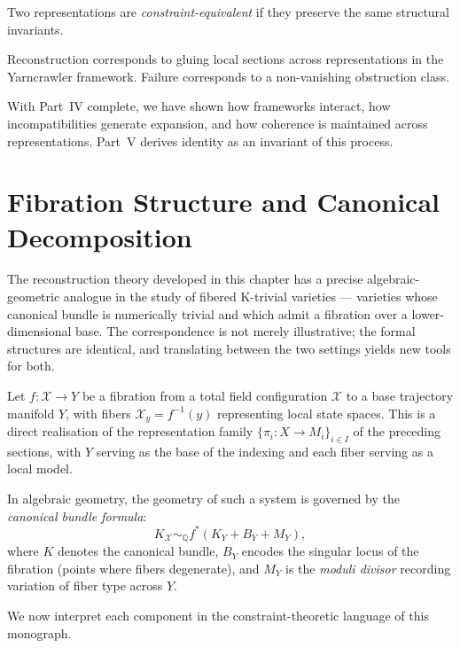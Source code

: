 \documentclass[11pt,openany]{book}
\begin{document}
\begin{definition}
\label{def:equivalence}
Two representations are \emph{constraint-equivalent} if
they preserve the same structural invariants.
\end{definition}

\begin{proposition}
\label{prop:gluing}
Reconstruction corresponds to gluing local sections across
representations in the Yarncrawler framework. Failure
corresponds to a non-vanishing obstruction class.
\end{proposition}

With Part~IV complete, we have shown how frameworks
interact, how incompatibilities generate expansion, and how
coherence is maintained across representations. Part~V
derives identity as an invariant of this process.


\section{Fibration Structure and Canonical Decomposition}
\label{sec:fibration-canonical}

The reconstruction theory developed in this chapter has a
precise algebraic-geometric analogue in the study of
fibered K-trivial varieties --- varieties whose canonical
bundle is numerically trivial and which admit a fibration
over a lower-dimensional base.  The correspondence is
not merely illustrative; the formal structures are
identical, and translating between the two settings yields
new tools for both.

Let $f : \mathcal{X} \to Y$ be a fibration from a total
field configuration $\mathcal{X}$ to a base trajectory
manifold $Y$, with fibers $\mathcal{X}_y = f^{-1}(y)$
representing local state spaces.  This is a direct
realisation of the representation family
$\{\pi_i : X \to M_i\}_{i \in I}$ of the preceding
sections, with $Y$ serving as the base of the indexing
and each fiber serving as a local model.

In algebraic geometry, the geometry of such a system is
governed by the \emph{canonical bundle formula}:
\[
  K_{\mathcal{X}} \sim_{\mathbb{Q}}
    f^*\!\left(K_Y + B_Y + M_Y\right),
\]
where $K$ denotes the canonical bundle, $B_Y$ encodes the
singular locus of the fibration (points where fibers
degenerate), and $M_Y$ is the \emph{moduli divisor}
recording variation of fiber type across $Y$.

We now interpret each component in the constraint-theoretic
language of this monograph.
\end{document}
